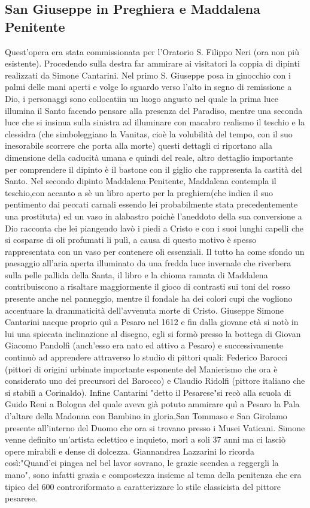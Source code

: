 \documentclass[12pt,a4paper]{article}
\begin{document}
	\subsection{San Giuseppe in Preghiera e Maddalena Penitente}
	Quest'opera era stata commissionata per l'Oratorio S. Filippo Neri (ora non più esistente).
	Procedendo sulla destra far ammirare ai visitatori la coppia di dipinti realizzati da Simone Cantarini.
	Nel primo S. Giuseppe posa in ginocchio con i palmi delle mani aperti e volge lo sguardo verso l'alto in segno di remissione a Dio, i personaggi sono collocatiin un luogo angusto nel quale la prima luce illumina il Santo facendo pensare alla presenza del Paradiso, mentre una seconda luce che si insinua sulla sinistra ad illuminare con macabro realismo il teschio e la clessidra (che simboleggiano la Vanitas, cioè la volubilità del tempo, con il suo inesorabile scorrere che porta alla morte) questi dettagli ci riportano alla dimensione della caducità umana e quindi del reale, altro dettaglio importante per comprendere il dipinto è il bastone con il giglio che rappresenta la castità del Santo.
	Nel secondo dipinto Maddalena Penitente, Maddalena contempla il teschio,con accanto a sè un libro aperto per la preghiera(che indica il suo pentimento dai peccati carnali essendo lei probabilmente stata precedentemente una prostituta) ed un vaso in alabastro poichè l'aneddoto della sua conversione a Dio racconta che lei piangendo lavò i piedi a Cristo e con i suoi lunghi capelli che si cosparse di oli profumati li pulì, a causa di questo motivo è spesso rappresentata con un vaso per contenere oli essenziali. 
	Il tutto ha come sfondo un paesaggio all'aria aperta illuminato da una fredda luce invernale che riverbera sulla pelle pallida della Santa, il libro e la chioma ramata di Maddalena contribuiscono a risaltare maggiormente il gioco di contrasti sui toni del rosso presente anche nel panneggio, mentre il fondale ha dei colori cupi che vogliono accentuare la drammaticità dell'avvenuta morte di Cristo.
	Giuseppe Simone Cantarini nacque proprio quì a Pesaro nel 1612 e fin dalla giovane età si notò in lui una spiccata inclinazione al disegno, egli si formò presso la bottega di Giovan Giacomo Pandolfi (anch'esso era nato ed attivo a Pesaro) e successivamente continuò ad apprendere attraverso lo studio di pittori quali: Federico Barocci (pittori di origini urbinate importante esponente del Manierismo che ora è considerato uno dei precursori del Barocco) e Claudio Ridolfi (pittore italiano che si stabilì a Corinaldo). Infine Cantarini "detto il Pesarese"si recò alla scuola di Guido Reni a Bologna del quale aveva già potuto ammirare quì a Pesaro la Pala d'altare della Madonna con Bambino in gloria,San Tommaso e San Girolamo presente all'interno del Duomo che ora si trovano presso i Musei Vaticani. Simone venne definito un'artista eclettico e inquieto, morì a soli 37 anni ma ci lasciò opere mirabili e dense di dolcezza.
	Giannandrea Lazzarini lo ricorda così:"Quand'ei pingea nel bel lavor sovrano, le grazie scendea a reggergli la mano", sono infatti grazia e compostezza insieme al tema della penitenza che era tipico del 600 controriformato a caratterizzare lo stile classicista del pittore pesarese.
\end{document}

